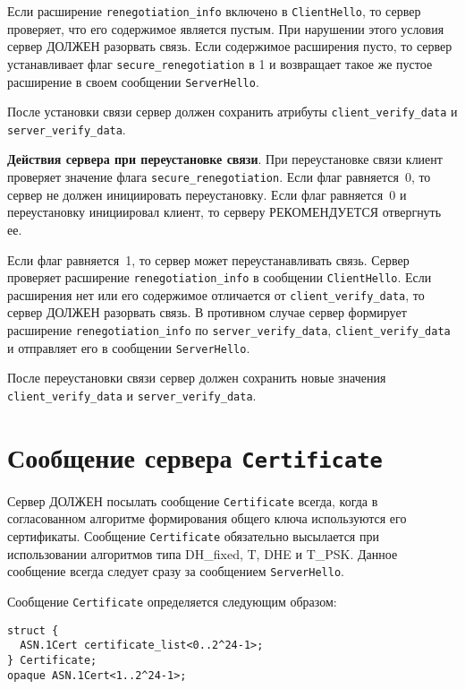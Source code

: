 Если расширение \lstinline{renegotiation_info} включено в
\lstinline{ClientHello}, то сервер проверяет, что его содержимое является
пустым. При нарушении этого условия сервер ДОЛЖЕН разорвать связь. 
Если содержимое расширения пусто, то сервер
устанавливает флаг \lstinline{secure_renegotiation} в 1 и возвращает 
такое же пустое расширение в своем сообщении \lstinline{ServerHello}.

После установки связи сервер должен сохранить атрибуты 
\lstinline{client_verify_data} и \lstinline{server_verify_data}. 

{\bf Действия сервера при переустановке связи}. 
При переустановке связи клиент
проверяет значение флага \lstinline{secure_renegotiation}. Если флаг
равняется~0, то сервер не должен инициировать переустановку. Если флаг
равняется~0 и переустановку инициировал клиент, то серверу РЕКОМЕНДУЕТСЯ
отвергнуть ее.

Если флаг равняется~1, то сервер может переустанавливать связь. Сервер
проверяет расширение \lstinline{renegotiation_info} в сообщении
\lstinline{ClientHello}. Если расширения нет или его содержимое отличается
от \lstinline{client_verify_data}, то сервер ДОЛЖЕН разорвать связь. В
противном случае сервер формирует расширение \lstinline{renegotiation_info}
по \lstinline{server_verify_data}, \lstinline{client_verify_data} и
отправляет его в сообщении \lstinline{ServerHello}.

После переустановки связи сервер должен сохранить новые 
значения \lstinline{client_verify_data} и \lstinline{server_verify_data}. 

\section{Сообщение сервера \lstinline{Certificate}}\label{HANDSHAKE.8}

Сервер ДОЛЖЕН посылать сообщение \lstinline{Certificate} всегда, когда в
согласованном алгоритме формирования общего ключа используются его
сертификаты. Сообщение \lstinline{Certificate} обязательно высылается при
использовании алгоритмов типа DH\_fixed, T,
DHE и T\_PSK. Данное сообщение всегда следует сразу
за сообщением \lstinline{ServerHello}.

Сообщение \lstinline{Certificate} определяется следующим образом:
\begin{lstlisting}
struct {
  ASN.1Cert certificate_list<0..2^24-1>;
} Certificate;
opaque ASN.1Cert<1..2^24-1>;  
\end{lstlisting}


